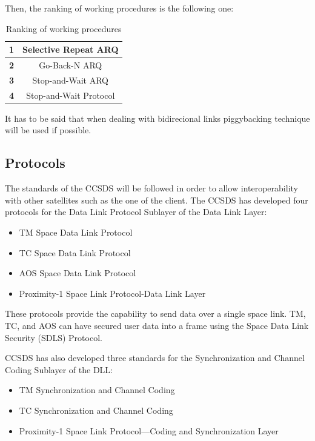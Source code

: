 Then, the ranking of working procedures is the following one: 

\begin{table}[H]
\begin{center}
\begin{tabular}{|c|c|}
\hline
\textbf{1}&Selective Repeat ARQ\\
\hline
\textbf{2}&Go-Back-N ARQ\\
\hline
\textbf{3}&Stop-and-Wait ARQ\\
\hline
\textbf{4}&Stop-and-Wait Protocol\\
\hline
\end{tabular}
\caption{Ranking of working procedures}
\end{center}
\end{table}

It has to be said that when dealing with bidirecional links piggybacking technique will be used if possible.

\subsection{Protocols}
The standards of the CCSDS will be followed in order to allow interoperability with other satellites such as the one of the client. The CCSDS has developed four protocols for the Data Link Protocol Sublayer of the Data Link Layer\cite{Secretariat2014}:

\begin{itemize}
\item TM Space Data Link Protocol
\item TC Space Data Link Protocol
\item AOS Space Data Link Protocol
\item Proximity-1 Space Link Protocol-Data Link Layer
\end{itemize}

These protocols provide the capability to send data over a single space link. TM, TC, and AOS can have secured user data into a frame using the Space Data Link Security (SDLS) Protocol.

CCSDS has also developed three standards for the Synchronization and Channel Coding Sublayer of the DLL:
\begin{itemize}
\item TM Synchronization and Channel Coding
\item TC Synchronization and Channel Coding
\item Proximity-1 Space Link Protocol—Coding and Synchronization Layer
\end{itemize}

